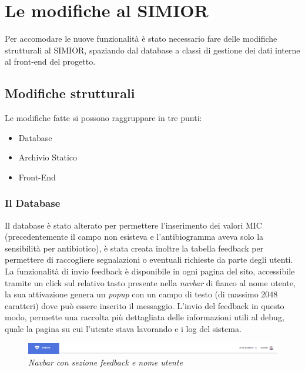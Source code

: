 \chapter{Le modifiche al SIMIOR}
Per accomodare le nuove funzionalità è stato necessario fare delle modifiche strutturali al SIMIOR, spaziando dal database a classi di gestione dei dati interne al front-end del progetto.
\section{Modifiche strutturali}\label{modifiche_strutturali}
Le modifiche fatte si possono raggruppare in tre punti:
\begin{itemize}
	\item Database
	\item Archivio Statico
	\item Front-End
\end{itemize}
\subsection{Il Database}
Il database è stato alterato per permettere l'inserimento dei valori MIC (precedentemente il campo non esisteva e l'antibiogramma aveva solo la sensibilità per antibiotico), è stata creata inoltre la tabella feedback per permettere di raccogliere segnalazioni o eventuali richieste da parte degli utenti.
La funzionalità di invio feedback è disponibile in ogni pagina del sito, accessibile tramite un click sul relativo tasto presente nella \textit{navbar} di fianco al nome utente, la sua attivazione genera un \textit{popup} con un campo di testo (di massimo 2048 caratteri) dove può essere inserito il messaggio. L'invio del feedback in questo modo, permette una raccolta più dettagliata delle informazioni utili al debug, quale la pagina su cui l'utente stava lavorando e i log del sistema.
\begin{figure}[h!]
	\centering
	\includegraphics[width=.99\columnwidth]{images/navbar}
	\caption{\textit{Navbar con sezione feedback e nome utente}}
	\label{fig:feature_location}
\end{figure}
\newline
